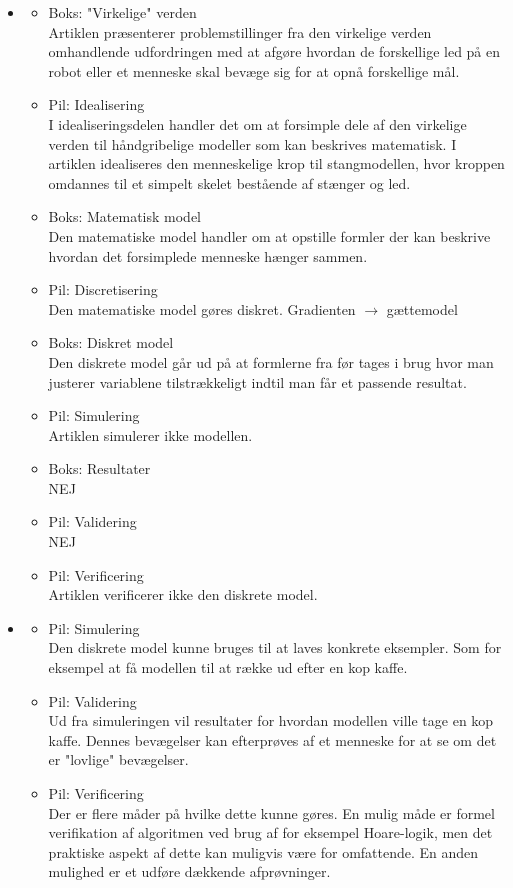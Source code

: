 \documentclass{article}
\begin{document}
\begin{itemize}
	\item
\begin{itemize}
	\item Boks: "Virkelige" verden \\
	Artiklen præsenterer problemstillinger fra den virkelige verden omhandlende udfordringen med at afgøre hvordan de forskellige led på en robot eller et menneske skal bevæge sig for at opnå forskellige mål.
	\item Pil: Idealisering \\
	I idealiseringsdelen handler det om at forsimple dele af den virkelige verden til håndgribelige modeller som kan beskrives matematisk. I artiklen idealiseres den menneskelige krop til stangmodellen, hvor kroppen omdannes til et simpelt skelet bestående af stænger og led.
	\item Boks: Matematisk model \\
	Den matematiske model handler om at opstille formler der kan beskrive hvordan det forsimplede menneske hænger sammen.
	\item Pil: Discretisering \\
	Den matematiske model gøres diskret. Gradienten $\rightarrow$ gættemodel%
	\item Boks: Diskret model \\
	Den diskrete model går ud på at formlerne fra før tages i brug hvor man justerer variablene tilstrækkeligt indtil man får et passende resultat. %
	\item Pil: Simulering \\
	Artiklen simulerer ikke modellen. %
	\item Boks: Resultater \\
	NEJ %
	\item Pil: Validering \\
	NEJ %
	\item Pil: Verificering \\
	Artiklen verificerer ikke den diskrete model.
\end{itemize}

\item
\begin{itemize}
	\item Pil: Simulering \\
	Den diskrete model kunne bruges til at laves konkrete eksempler. Som for eksempel at få modellen til at række ud efter en kop kaffe.
	\item Pil: Validering \\
	Ud fra simuleringen vil resultater for hvordan modellen ville tage en kop kaffe. Dennes bevægelser kan efterprøves af et menneske for at se om det er "lovlige" bevægelser.
	\item Pil: Verificering \\
	Der er flere måder på hvilke dette kunne gøres. En mulig måde er formel verifikation af algoritmen ved brug af for eksempel Hoare-logik, men det praktiske aspekt af dette kan muligvis være for omfattende. En anden mulighed er et udføre dækkende afprøvninger.
\end{itemize}
\end{itemize}
\end{document}
